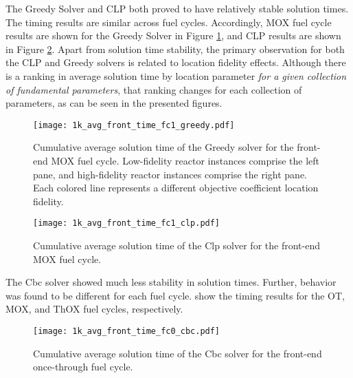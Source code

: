 The Greedy Solver and CLP both proved to have relatively stable solution
times. The timing results are similar across fuel cycles. Accordingly, MOX fuel
cycle results are shown for the Greedy Solver in Figure
\ref{fig:1k_avg_front_time_fc1_greedy}, and CLP results are shown in Figure
\ref{fig:1k_avg_front_time_fc1_clp}. Apart from solution time stability, the
primary observation for both the CLP and Greedy solvers is related to location
fidelity effects. Although there is a ranking in average solution time by
location parameter \textit{for a given collection of fundamental parameters},
that ranking changes for each collection of parameters, as can be seen in the
presented figures.

\begin{figure}[h!]
  \begin{center}
    \texttt{[image: 1k\_avg\_front\_time\_fc1\_greedy.pdf]}
    \caption[]{
      \label{fig:1k_avg_front_time_fc1_greedy}
      Cumulative average solution time of the Greedy solver for the front-end
      MOX fuel cycle. Low-fidelity reactor instances comprise the left pane, and
      high-fidelity reactor instances comprise the right pane. Each colored line
      represents a different objective coefficient location fidelity.}
  \end{center}
\end{figure}

\begin{figure}[h!]
  \begin{center}
    \texttt{[image: 1k\_avg\_front\_time\_fc1\_clp.pdf]}
    \caption[]{
      \label{fig:1k_avg_front_time_fc1_clp}
      Cumulative average solution time of the Clp solver for the front-end MOX fuel
      cycle.}
  \end{center}
\end{figure}

The Cbc solver showed much less stability in solution times. Further, behavior
was found to be different for each fuel
cycle. 
show the timing results for the OT, MOX, and ThOX fuel cycles,
respectively. 

\begin{figure}[h!]
  \begin{center}
    \texttt{[image: 1k\_avg\_front\_time\_fc0\_cbc.pdf]}
    \caption[]{
      \label{fig:1k_avg_front_time_fc0_cbc}
      Cumulative average solution time of the Cbc solver for the front-end
      once-through fuel cycle.}
  \end{center}
\end{figure}

